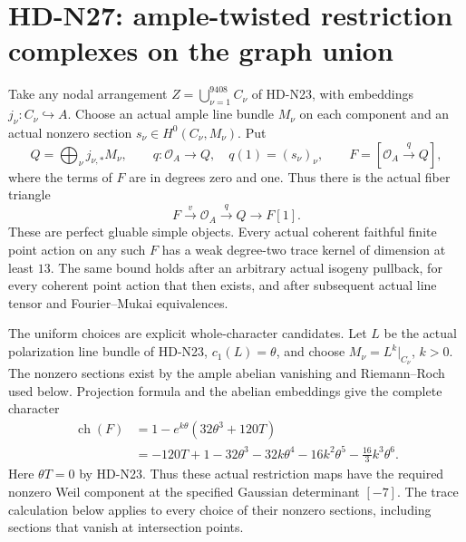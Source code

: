 \section{HD-N27: ample-twisted restriction complexes on the graph union}
\label{sec:ample-twisted-graph-restrictions}

Take any nodal arrangement $Z=\bigcup_{\nu=1}^{9408}C_\nu$
of HD-N23, with embeddings $j_\nu:C_\nu\hookrightarrow A$.
Choose an actual ample line bundle $M_\nu$ on each component
and an actual nonzero section $s_\nu\in H^0(C_\nu,M_\nu)$.
Put
\[
 Q=\bigoplus_\nu j_{\nu,*}M_\nu,\qquad
 q:\mathcal O_A\longrightarrow Q,
       \quad q(1)=(s_\nu)_\nu,\qquad
 F=[\mathcal O_A\xrightarrow{q}Q],                         \tag{N27.1}
\]
where the terms of $F$ are in degrees zero and one. Thus
there is the actual fiber triangle
\[
                   F\xrightarrow{v}\mathcal O_A
                    \xrightarrow{q}Q\longrightarrow F[1].
                                                               \tag{N27.2}
\]
These are perfect gluable simple objects. Every actual
coherent faithful finite point action on any such $F$ has
a weak degree-two trace kernel of dimension at least $13$.
The same bound holds after an arbitrary actual isogeny
pullback, for every coherent point action that then exists,
and after subsequent actual line tensor and Fourier--Mukai
equivalences.

The uniform choices are explicit whole-character candidates.
Let $L$ be the actual polarization line bundle of HD-N23,
$c_1(L)=\theta$, and choose $M_\nu=L^k|_{C_\nu}$, $k>0$.
The nonzero sections exist by the ample abelian vanishing
and Riemann--Roch used below. Projection formula and the
abelian embeddings give the complete character
\[
 \begin{split}
 \operatorname{ch}(F)
 &=1-e^{k\theta}(32\theta^3+120T)\\
 &=-120T+1-32\theta^3-32k\theta^4
                      -16k^2\theta^5-\frac{16}{3}k^3\theta^6.
 \end{split}                                                  \tag{N27.3}
\]
Here $\theta T=0$ by HD-N23. Thus these actual restriction
maps have the required nonzero Weil component at the
specified Gaussian determinant $[-7]$. The trace calculation
below applies to every choice of their nonzero sections,
including sections that vanish at intersection points.

